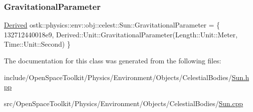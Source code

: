 \subsubsection{\texorpdfstring{Gravitational\+Parameter}{GravitationalParameter}}
{\footnotesize\ttfamily \hyperlink{classostk_1_1physics_1_1units_1_1_derived}{Derived} ostk\+::physics\+::env\+::obj\+::celest\+::\+Sun\+::\+Gravitational\+Parameter = \{ 132712440018e9, Derived\+::\+Unit\+::\+Gravitational\+Parameter(\+Length\+::\+Unit\+::\+Meter, Time\+::\+Unit\+::\+Second) \}\hspace{0.3cm}{\ttfamily [static]}}



The documentation for this class was generated from the following files\+:\begin{DoxyCompactItemize}
\item 
include/\+Open\+Space\+Toolkit/\+Physics/\+Environment/\+Objects/\+Celestial\+Bodies/\hyperlink{_objects_2_celestial_bodies_2_sun_8hpp}{Sun.\+hpp}\item 
src/\+Open\+Space\+Toolkit/\+Physics/\+Environment/\+Objects/\+Celestial\+Bodies/\hyperlink{_objects_2_celestial_bodies_2_sun_8cpp}{Sun.\+cpp}\end{DoxyCompactItemize}
